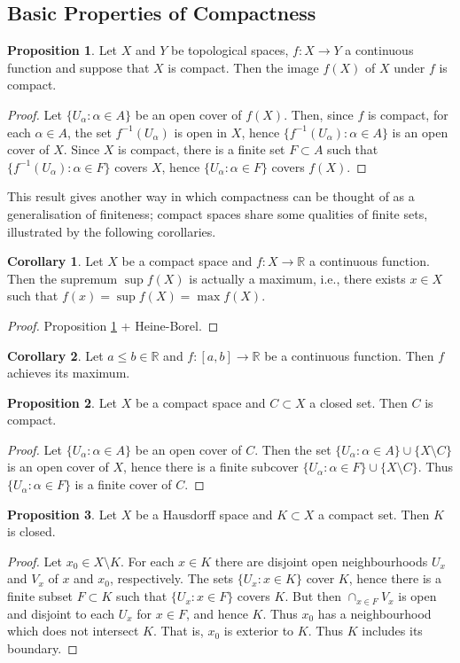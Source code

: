 \documentclass{book}
\theoremstyle{definition}
\newtheorem{proposition}{Proposition}[section]
\newtheorem{corollary}{Corollary}[theorem]
\theoremstyle{remark}
\newcommand{\R}{\mathbb{R}}
\begin{document}
\subsection{Basic Properties of Compactness}
\begin{proposition}
\label{continuousimagecompact}
Let $X$ and $Y$ be topological spaces, $f:X\to Y$ a continuous function and suppose that $X$ is compact. Then the image $f(X)$ of $X$ under $f$ is compact.
\end{proposition}
\begin{proof}
Let $\{U_\alpha:\alpha\in A\}$ be an open cover of $f(X)$. Then, since $f$ is compact, for each $\alpha\in A$, the set $f^{-1}(U_\alpha)$ is open in $X$, hence $\{f^{-1}(U_\alpha):\alpha\in A\}$ is an open cover of $X$. Since $X$ is compact, there is a finite set $F\subset A$ such that $\{f^{-1}(U_\alpha):\alpha\in F\}$ covers $X$, hence $\{U_\alpha:\alpha\in F\}$ covers $f(X)$.
\end{proof}
This result gives another way in which compactness can be thought of as a generalisation of finiteness; compact spaces share some qualities of finite sets, illustrated by the following corollaries.
\begin{corollary}
Let $X$ be a compact space and $f:X\to\R$ a continuous function. Then the supremum $\sup f(X)$ is actually a maximum, i.e., there exists $x\in X$ such that $f(x)=\sup f(X)=\max f(X)$.
\end{corollary}
\begin{proof}
Proposition \ref{continuousimagecompact} + Heine-Borel.
\end{proof}
\begin{corollary}
Let $a\leq b\in\R$ and $f:[a,b]\to\R$ be a continuous function. Then $f$ achieves its maximum.
\end{corollary}

\begin{proposition}
Let $X$ be a compact space and $C\subset X$ a closed set. Then $C$ is compact.
\end{proposition}
\begin{proof}
Let $\{U_\alpha:\alpha\in A\}$ be an open cover of $C$. Then the set $\{U_\alpha:\alpha\in A\}\cup\{X\setminus C\}$ is an open cover of $X$, hence there is a finite subcover $\{U_\alpha:\alpha\in F\}\cup\{X\setminus C\}$. Thus $\{U_\alpha:\alpha\in F\}$ is a finite cover of $C$.
\end{proof}

\begin{proposition}
Let $X$ be a Hausdorff space and $K\subset X$ a compact set. Then $K$ is closed.
\end{proposition}
\begin{proof}
Let $x_0\in X\setminus K$. For each $x\in K$ there are disjoint open neighbourhoods $U_x$ and $V_x$ of $x$ and $x_0$, respectively. The sets $\{U_x:x\in K\}$ cover $K$, hence there is a finite subset $F\subset K$ such that $\{U_x:x\in F\}$ covers $K$. But then $\cap_{x\in F} V_x$ is open and disjoint to each $U_x$ for $x\in F$, and hence $K$. Thus $x_0$ has a neighbourhood which does not intersect $K$. That is, $x_0$ is exterior to $K$. Thus $K$ includes its boundary.
\end{proof}
\end{document}
